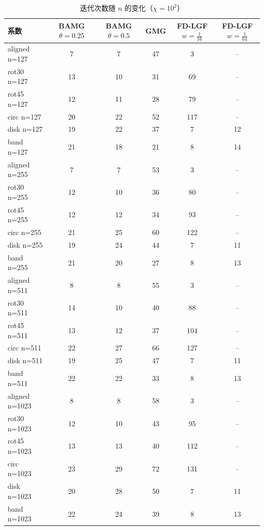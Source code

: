 \begin{table}[H]\centering\small
\caption{迭代次数随 $n$ 的变化（$\chi=10^{2}$）}\label{tab:n2}
\begin{tabular}{lccccc}
\toprule
系数 & BAMG $\theta{=}0.25$ & BAMG $\theta{=}0.5$ & GMG & FD-LGF $w{=}\frac1{16}$ & FD-LGF $w{=}\frac1{64}$ \\
\midrule
aligned n=127 & 7 & 7 & 47 & 3 & -- \\
rot30 n=127 & 13 & 10 & 31 & 69 & -- \\
rot45 n=127 & 12 & 11 & 28 & 79 & -- \\
circ n=127 & 20 & 22 & 52 & 117 & -- \\
disk n=127 & 19 & 22 & 37 & 7 & 12 \\
band n=127 & 21 & 18 & 21 & 8 & 14 \\
aligned n=255 & 7 & 7 & 53 & 3 & -- \\
rot30 n=255 & 12 & 10 & 36 & 80 & -- \\
rot45 n=255 & 12 & 12 & 34 & 93 & -- \\
circ n=255 & 21 & 25 & 60 & 122 & -- \\
disk n=255 & 19 & 24 & 44 & 7 & 11 \\
band n=255 & 21 & 20 & 27 & 8 & 13 \\
aligned n=511 & 8 & 8 & 55 & 3 & -- \\
rot30 n=511 & 14 & 10 & 40 & 88 & -- \\
rot45 n=511 & 13 & 12 & 37 & 104 & -- \\
circ n=511 & 22 & 27 & 66 & 127 & -- \\
disk n=511 & 19 & 25 & 47 & 7 & 11 \\
band n=511 & 22 & 22 & 33 & 8 & 13 \\
aligned n=1023 & 8 & 8 & 58 & 3 & -- \\
rot30 n=1023 & 12 & 10 & 43 & 95 & -- \\
rot45 n=1023 & 13 & 13 & 40 & 112 & -- \\
circ n=1023 & 23 & 29 & 72 & 131 & -- \\
disk n=1023 & 20 & 28 & 50 & 7 & 11 \\
band n=1023 & 22 & 24 & 39 & 8 & 13 \\
\bottomrule
\end{tabular}
\end{table}

